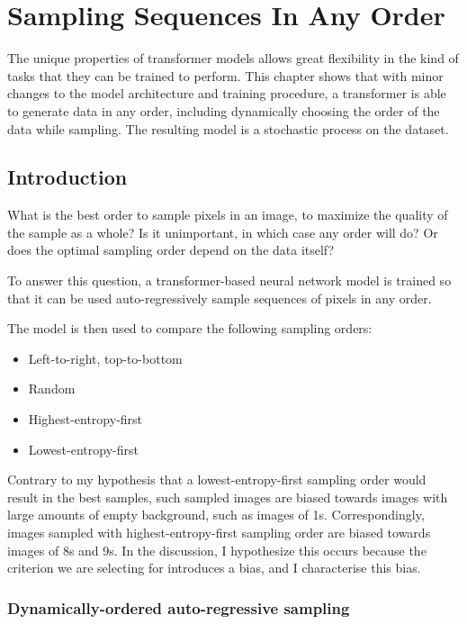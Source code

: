 \chapter{Sampling Sequences In Any Order}
\label{C:a-o-sampling}

The unique properties of transformer models allows great flexibility in the kind of tasks that they can be trained to perform. This chapter shows that with minor changes to the model architecture and training procedure, a transformer is able to generate data in any order, including dynamically choosing the order of the data while sampling. The resulting model is a stochastic process on the dataset.

\section{Introduction}

What is the best order to sample pixels in an image, to maximize the quality of the sample as a whole? Is it unimportant, in which case any order will do? Or does the optimal sampling order depend on the data itself?

To answer this question, a transformer-based neural network model is trained so that it can be used auto-regressively sample sequences of pixels in any order.

The model is then used to compare the following sampling orders:
\begin{itemize}
    \item Left-to-right, top-to-bottom
    \item Random
    \item Highest-entropy-first
    \item Lowest-entropy-first
\end{itemize}

Contrary to my hypothesis that a lowest-entropy-first sampling order would result in the best samples, such sampled images are biased towards images with large amounts of empty background, such as images of 1s. Correspondingly, images sampled with highest-entropy-first sampling order are biased towards images of 8s and 9s. In the discussion, I hypothesize this occurs because the criterion we are selecting for introduces a bias, and I characterise this bias.

\subsection{Dynamically-ordered auto-regressive sampling}

